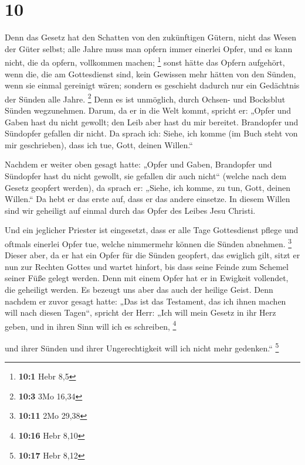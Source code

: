 \hypertarget{section-4}{%
\section{10}\label{section-4}}

 Denn das Gesetz hat den Schatten von den zukünftigen
Gütern, nicht das Wesen der Güter selbst; alle Jahre muss man opfern
immer einerlei Opfer, und es kann nicht, die da opfern, vollkommen
machen; \footnote{\textbf{10:1} Hebr 8,5}  sonst hätte das
Opfern aufgehört, wenn die, die am Gottesdienst sind, kein Gewissen mehr
hätten von den Sünden, wenn sie einmal gereinigt wären; 
sondern es geschieht dadurch nur ein Gedächtnis der Sünden alle Jahre.
\footnote{\textbf{10:3} 3Mo 16,34}  Denn es ist unmöglich,
durch Ochsen- und Bocksblut Sünden wegzunehmen.  Darum, da
er in die Welt kommt, spricht er: „Opfer und Gaben hast du nicht
gewollt; den Leib aber hast du mir bereitet.  Brandopfer
und Sündopfer gefallen dir nicht.  Da sprach ich: Siehe,
ich komme (im Buch steht von mir geschrieben), dass ich tue, Gott,
deinen Willen.``

 Nachdem er weiter oben gesagt hatte: „Opfer und Gaben,
Brandopfer und Sündopfer hast du nicht gewollt, sie gefallen dir auch
nicht`` (welche nach dem Gesetz geopfert werden),  da
sprach er: „Siehe, ich komme, zu tun, Gott, deinen Willen.`` Da hebt er
das erste auf, dass er das andere einsetze.  In diesem
Willen sind wir geheiligt auf einmal durch das Opfer des Leibes Jesu
Christi.

 Und ein jeglicher Priester ist eingesetzt, dass er alle
Tage Gottesdienst pflege und oftmals einerlei Opfer tue, welche
nimmermehr können die Sünden abnehmen. \footnote{\textbf{10:11} 2Mo
  29,38}  Dieser aber, da er hat ein Opfer für die Sünden
geopfert, das ewiglich gilt, sitzt er nun zur Rechten Gottes
 und wartet hinfort, bis dass seine Feinde zum Schemel
seiner Füße gelegt werden.  Denn mit einem Opfer hat er
in Ewigkeit vollendet, die geheiligt werden.  Es bezeugt
uns aber das auch der heilige Geist. Denn nachdem er zuvor gesagt hatte:
 „Das ist das Testament, das ich ihnen machen will nach
diesen Tagen``, spricht der Herr: „Ich will mein Gesetz in ihr Herz
geben, und in ihren Sinn will ich es schreiben, \footnote{\textbf{10:16}
  Hebr 8,10}

 und ihrer Sünden und ihrer Ungerechtigkeit will ich
nicht mehr gedenken.`` \footnote{\textbf{10:17} Hebr 8,12}

